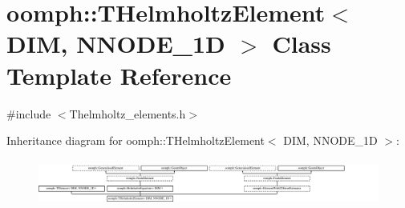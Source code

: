 \hypertarget{classoomph_1_1THelmholtzElement}{}\section{oomph\+:\+:T\+Helmholtz\+Element$<$ D\+IM, N\+N\+O\+D\+E\+\_\+1D $>$ Class Template Reference}
\label{classoomph_1_1THelmholtzElement}


{\ttfamily \#include $<$Thelmholtz\+\_\+elements.\+h$>$}

Inheritance diagram for oomph\+:\+:T\+Helmholtz\+Element$<$ D\+IM, N\+N\+O\+D\+E\+\_\+1D $>$\+:\begin{figure}[H]
\begin{center}
\leavevmode
\includegraphics[height=1.534247cm]{classoomph_1_1THelmholtzElement}
\end{center}
\end{figure}
